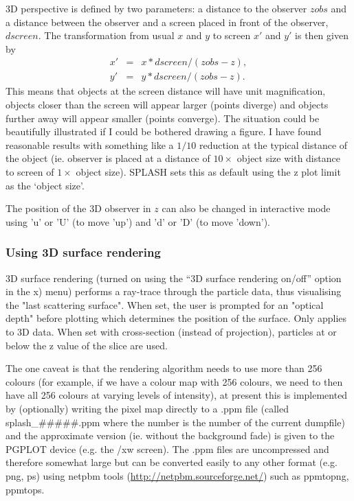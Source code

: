 \documentclass[a4paper,11pt]{article}
\begin{document}
  3D perspective is defined by two parameters: a distance to the observer $zobs$ and a distance between the observer and a screen placed in front of the observer, $dscreen$.
The transformation from usual $x$ and $y$ to screen $x'$ and $y'$ is then given by
\begin{eqnarray}
x' & = & x*dscreen/(zobs-z), \nonumber \\
y' & = & y*dscreen/(zobs-z).
\end{eqnarray}
 This means that objects at the screen distance will have unit magnification, objects closer than the
screen will appear larger (points diverge) and objects further away will appear smaller (points
converge). The situation could be beautifully illustrated if I could be bothered drawing a figure. I have found reasonable results with something like a $1/10$ reduction at the typical distance of the object (ie. observer is placed at a distance of $10\times$ object size with distance to screen of $1\times$ object size). SPLASH sets this as default using the z plot limit as the `object size'.

 The position of the 3D observer in $z$ can also be changed in interactive mode using 'u' or 'U' (to move 'up') and 'd' or 'D' (to move 'down'). 

\subsubsection{ Using 3D surface rendering}
 3D surface rendering (turned on using the ``3D surface rendering on/off'' option in the x) menu) performs a ray-trace through the particle data, thus visualising the "last scattering surface". When set, the user is prompted for an "optical depth" before plotting which determines the position of the surface. Only applies to 3D data. When set with cross-section (instead of projection), particles at or below the z value of the slice are used.

The one caveat is that the rendering algorithm needs to use more than 256 colours (for example, if we have a colour map with 256 colours, we need to then have all 256 colours at varying levels of intensity), at present this is implemented by
(optionally) writing the pixel map directly to a .ppm file (called splash\_\#\#\#\#\#.ppm where the number is the number of the current dumpfile) and the approximate version (ie. without the background fade)
is given to the PGPLOT device (e.g. the /xw screen). The .ppm files are uncompressed and therefore somewhat large but can be converted easily to any
other format (e.g. png, ps) using netpbm tools (\url{http://netpbm.sourceforge.net/}) such as
ppmtopng, ppmtops.
\end{document}

